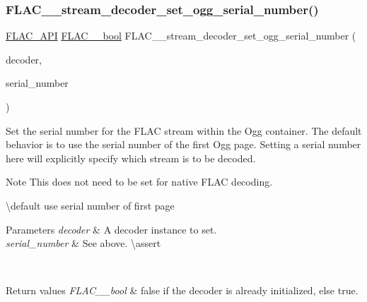 \subsubsection{\texorpdfstring{FLAC\_\_stream\_decoder\_set\_ogg\_serial\_number()}{FLAC\_\_stream\_decoder\_set\_ogg\_serial\_number()}}
{\footnotesize\ttfamily \mbox{\hyperlink{group__flac__export_ga56ca07df8a23310707732b1c0007d6f5}{F\+L\+A\+C\+\_\+\+A\+PI}} \mbox{\hyperlink{ordinals_8h_a95103469f1cbd78b8cf250194985b34e}{F\+L\+A\+C\+\_\+\+\_\+bool}} F\+L\+A\+C\+\_\+\+\_\+stream\+\_\+decoder\+\_\+set\+\_\+ogg\+\_\+serial\+\_\+number (\begin{DoxyParamCaption}\item[{\mbox{\hyperlink{struct_f_l_a_c_____stream_decoder}{F\+L\+A\+C\+\_\+\+\_\+\+Stream\+Decoder}} $\ast$}]{decoder,  }\item[{long}]{serial\+\_\+number }\end{DoxyParamCaption})}

Set the serial number for the F\+L\+AC stream within the Ogg container. The default behavior is to use the serial number of the first Ogg page. Setting a serial number here will explicitly specify which stream is to be decoded.

\begin{DoxyNote}{Note}
This does not need to be set for native F\+L\+AC decoding.
\end{DoxyNote}
\textbackslash{}default {\ttfamily use} serial number of first page 
\begin{DoxyParams}{Parameters}
{\em decoder} & A decoder instance to set. \\
\hline
{\em serial\+\_\+number} & See above. \textbackslash{}assert 
\begin{DoxyCode}{1}
\end{DoxyCode}
 \\
\hline
\end{DoxyParams}

\begin{DoxyRetVals}{Return values}
{\em F\+L\+A\+C\+\_\+\+\_\+bool} & {\ttfamily false} if the decoder is already initialized, else {\ttfamily true}. \\
\hline
\end{DoxyRetVals}
\mbox{\label{group__flac__stream__decoder_ga371bc2b4f5571e40c47f4db5a8a745f8}} 
